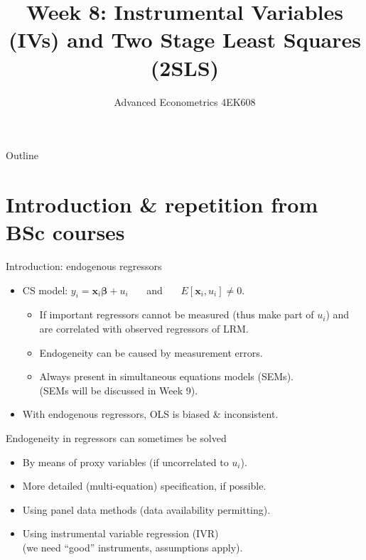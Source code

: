 \documentclass[usenames,dvipsnames]{beamer}
\title[Week8]{Week 8: Instrumental Variables (IVs) and Two Stage Least Squares (2SLS)}
\author{Advanced Econometrics 4EK608}
\institute{Vysoká škola ekonomická v Praze}
\date{}
\begin{document}
 
\begin{frame}
  \titlepage
\end{frame}

\begin{frame}{Outline}
  \tableofcontents
\end{frame}

\section{Introduction \& repetition from BSc courses}
\begin{frame}{Introduction: endogenous regressors}
\begin{itemize}
\item  CS model: $y_i= \bm{x}_i\bm{\beta}+u_i$ ~~~and~~~ $E[\bm{x}_i, u_i] \neq 0$.
\begin{itemize}
\item If important regressors cannot be measured (thus make part of $u_i$)
and are correlated with observed regressors of LRM.
\item Endogeneity can be caused by measurement errors.
\item Always present in simultaneous equations models (SEMs). \\(SEMs will be discussed in Week 9).
\end{itemize}
\item With endogenous regressors, OLS is biased \& inconsistent.
\end{itemize}
\medskip
Endogeneity in regressors can sometimes be solved
\begin{itemize}
\item By means of proxy variables (if uncorrelated to $u_i$).
\item More detailed (multi-equation) specification, if possible.
\item Using panel data methods (data availability permitting).
\item Using instrumental variable regression (IVR) \\(we need ``good'' instruments, assumptions apply).
\end{itemize}
\end{frame}
\end{document}

